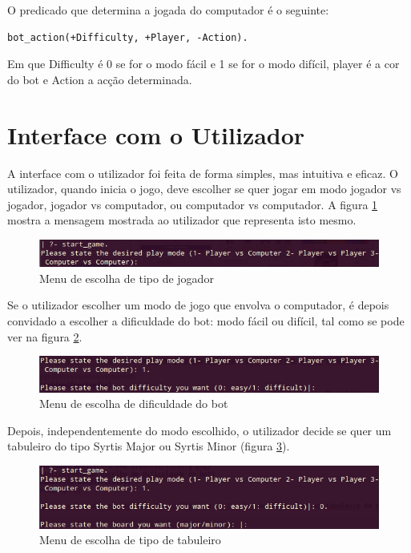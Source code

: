 \documentclass[a4paper]{article}
\begin{document}
O predicado que determina a jogada do computador é o seguinte:

\begin{lstlisting}
bot_action(+Difficulty, +Player, -Action).
\end{lstlisting}

Em que Difficulty é 0 se for o modo fácil e 1 se for o modo difícil, player é a cor do bot e Action a acção determinada.

\section{Interface com o Utilizador}

A interface com o utilizador foi feita de forma simples, mas intuitiva e eficaz. O utilizador, quando inicia o jogo, deve escolher se quer jogar em modo jogador vs jogador, jogador vs computador, ou computador vs computador. A figura \ref{fig:startgame} mostra a mensagem mostrada ao utilizador que representa isto mesmo.

\begin{figure}[h]
\centering
\includegraphics[scale=0.5]{startgame.png}
\caption{Menu de escolha de tipo de jogador}
\label{fig:startgame}
\end{figure}

Se o utilizador escolher um modo de jogo que envolva o computador, é depois convidado a escolher a dificuldade do bot: modo fácil ou difícil, tal como se pode ver na figura \ref{fig:botdifficulty}.

\begin{figure}[h]
\centering
\includegraphics[scale=0.5]{botdifficulty.png}
\caption{Menu de escolha de dificuldade do bot}
\label{fig:botdifficulty}
\end{figure}

Depois, independentemente do modo escolhido, o utilizador decide se quer um tabuleiro do tipo Syrtis Major ou Syrtis Minor (figura \ref{fig:pickboard}).

\begin{figure}[h]
\centering
\includegraphics[scale=0.5]{pickboard.png}
\caption{Menu de escolha de tipo de tabuleiro}
\label{fig:pickboard}
\end{figure}
\end{document}
